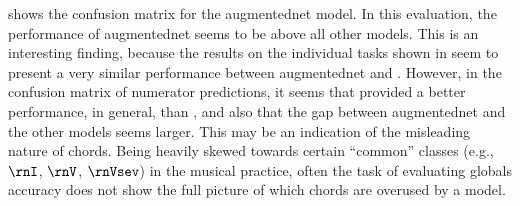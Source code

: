 

 shows the
confusion matrix for the \gls{augmentednet} model. In this
evaluation, the performance of \gls{augmentednet} seems to
be above all other models. This is an interesting finding,
because the results on the individual tasks shown in
 seem to present a very similar
performance between \gls{augmentednet} and
\textcite{micchi2021deep}. However, in the confusion matrix
of numerator predictions, it seems that
\textcite{mcleod2021modular} provided a better performance,
in general, than \textcite{micchi2021deep}, and also that the
gap between \gls{augmentednet} and the other models seems
larger. This may be an indication of the misleading nature
of chords. Being heavily skewed towards certain ``common''
classes (e.g., $\rnI$, $\rnV$, $\rnVsev$) in the musical
practice, often the task of evaluating globals accuracy does
not show the full picture of which chords are overused by a
model. 


